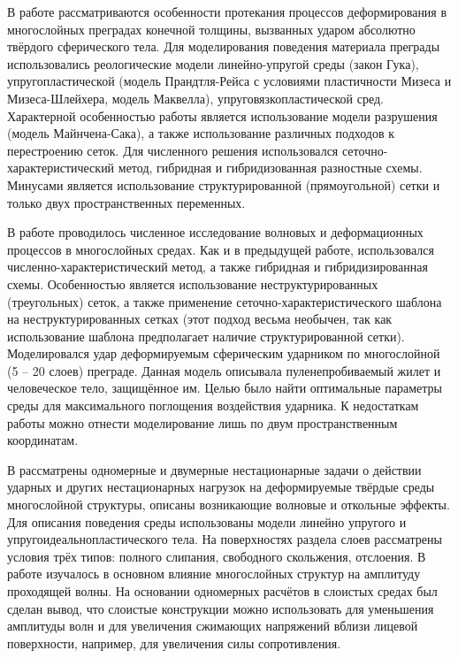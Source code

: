 В работе \cite{petrov_chelnokov} рассматриваются особенности протекания процессов деформирования в многослойных преградах конечной толщины, вызванных ударом абсолютно твёрдого сферического тела. Для моделирования поведения материала преграды использовались реологические модели линейно-упругой среды (закон Гука), упругопластической (модель Прандтля-Рейса с условиями пластичности Мизеса и Мизеса-Шлейхера, модель Маквелла), упруговязкопластической сред. Характерной особенностью работы является использование модели разрушения (модель Майнчена-Сака), а также использование различных подходов к перестроению сеток. Для численного решения использовался сеточно-характеристический метод, гибридная и гибридизованная разностные схемы. Минусами является использование структурированной (прямоугольной) сетки и только двух пространственных переменных.

В работе \cite{matyushev_petrov} проводилось численное исследование волновых и деформационных процессов в многослойных  средах. Как и в предыдущей работе, использовался численно-характеристический метод, а также гибридная и гибридизированная схемы. Особенностью является использование неструктурированных (треугольных) сеток, а также применение сеточно-характеристического шаблона на неструктурированных сетках (этот подход весьма необычен, так как использование шаблона предполагает наличие структурированной сетки). Моделировался удар деформируемым сферическим ударником по многослойной (5 – 20 слоев) преграде. Данная модель описывала пуленепробиваемый жилет и человеческое тело, защищённое им. Целью было найти оптимальные параметры среды для максимального поглощения воздействия ударника. К недостаткам работы можно отнести моделирование лишь по двум пространственным координатам.

В \cite{petrov_tormasov_holodov} рассматрены одномерные и двумерные нестационарные задачи о действии ударных и других нестационарных нагрузок на деформируемые твёрдые среды многослойной структуры, описаны возникающие волновые и откольные эффекты. Для описания поведения среды использованы модели линейно упругого и упругоидеальнопластического тела. На поверхностях раздела слоев рассматрены условия трёх типов: полного слипания, свободного скольжения, отслоения. В работе изучалось в основном влияние многослойных структур на амплитуду проходящей волны. На основании одномерных расчётов в слоистых средах был сделан вывод, что слоистые конструкции можно использовать для уменьшения амплитуды волн и для увеличения сжимающих напряжений вблизи лицевой поверхности, например, для увеличения силы сопротивления.

